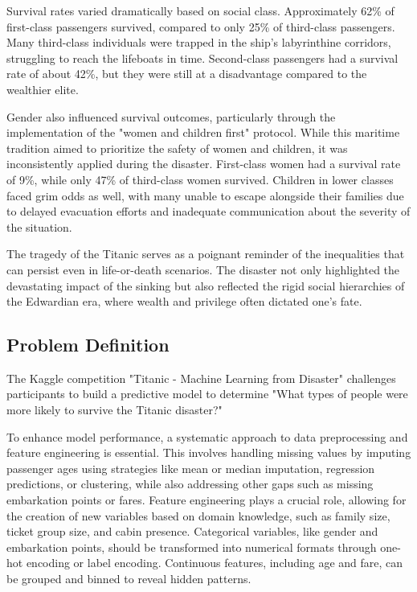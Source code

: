 \documentclass[conference]{IEEEtran}
\begin{document}
Survival rates varied dramatically based on social class. Approximately 62\% of first-class passengers survived, compared to only 25\% of third-class passengers\cite{wiki:Titanic}. Many third-class individuals were trapped in the ship’s labyrinthine corridors, struggling to reach the lifeboats in time. Second-class passengers had a survival rate of about 42\%\cite{wiki:Titanic}, but they were still at a disadvantage compared to the wealthier elite.

Gender also influenced survival outcomes, particularly through the implementation of the "women and children first" protocol. While this maritime tradition aimed to prioritize the safety of women and children, it was inconsistently applied during the disaster. First-class women had a survival rate of 9\%, while only 47\% of third-class women survived\cite{wiki:Titanic}. Children in lower classes faced grim odds as well, with many unable to escape alongside their families due to delayed evacuation efforts and inadequate communication about the severity of the situation.

The tragedy of the Titanic serves as a poignant reminder of the inequalities that can persist even in life-or-death scenarios. The disaster not only highlighted the devastating impact of the sinking but also reflected the rigid social hierarchies of the Edwardian era, where wealth and privilege often dictated one’s fate.

\subsection{Problem Definition}

The Kaggle competition "Titanic - Machine Learning from Disaster" challenges participants to build a predictive model to determine "What types of people were more likely to survive the Titanic disaster?"\cite{kaggleTitanicMachine} 

To enhance model performance, a systematic approach to data preprocessing and feature engineering is essential. This involves handling missing values by imputing passenger ages using strategies like mean or median imputation, regression predictions, or clustering, while also addressing other gaps such as missing embarkation points or fares. Feature engineering plays a crucial role, allowing for the creation of new variables based on domain knowledge, such as family size, ticket group size, and cabin presence. Categorical variables, like gender and embarkation points, should be transformed into numerical formats through one-hot encoding or label encoding. Continuous features, including age and fare, can be grouped and binned to reveal hidden patterns. 
\end{document}
